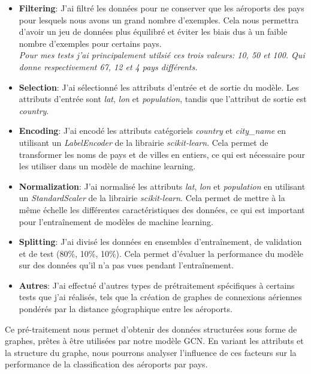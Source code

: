 \begin{itemize}
    \item {
        \textbf{Filtering}: J'ai filtré les données pour ne conserver que les aéroports des pays pour lesquels nous avons un grand nombre d'exemples. Cela nous permettra d'avoir un jeu de données plus équilibré et éviter les biais dus à un faible nombre d'exemples pour certains pays.\\
        \textit{Pour mes tests j'ai principalement utilsié ces trois valeurs: 10, 50 et 100. Qui donne respectivement 67, 12 et 4 pays différents.}
    }
    \item {
        \textbf{Selection}: J'ai sélectionné les attributs d'entrée et de sortie du modèle. Les attributs d'entrée sont \textit{lat}, \textit{lon} et \textit{population}, tandis que l'attribut de sortie est \textit{country}.
    }
    \item {
        \textbf{Encoding}: J'ai encodé les attributs catégoriels \textit{country} et \textit{city\_name} en utilisant un \textit{LabelEncoder} de la librairie \textit{scikit-learn}. Cela permet de transformer les noms de pays et de villes en entiers, ce qui est nécessaire pour les utiliser dans un modèle de machine learning.
    }
    \item {
        \textbf{Normalization}: J'ai normalisé les attributs \textit{lat}, \textit{lon} et \textit{population} en utilisant un \textit{StandardScaler} de la librairie \textit{scikit-learn}. Cela permet de mettre à la même échelle les différentes caractéristiques des données, ce qui est important pour l'entraînement de modèles de machine learning.
    }
    \item {
        \textbf{Splitting}: J'ai divisé les données en ensembles d'entraînement, de validation et de test (80\%, 10\%, 10\%). Cela permet d'évaluer la performance du modèle sur des données qu'il n'a pas vues pendant l'entraînement.
    }
    \item {
        \textbf{Autres}: J'ai effectué d'autres types de prétraitement spécifiques à certains tests que j'ai réalisés, tels que la création de graphes de connexions aériennes pondérés par la distance géographique entre les aéroports.
    }
\end{itemize}

Ce pré-traitement nous permet d'obtenir des données structurées sous forme de graphes,  prêtes à être utilisées par notre modèle GCN.  En variant les attributs et la structure du graphe,  nous pourrons analyser l'influence de ces facteurs sur la performance de la classification des aéroports par pays.
